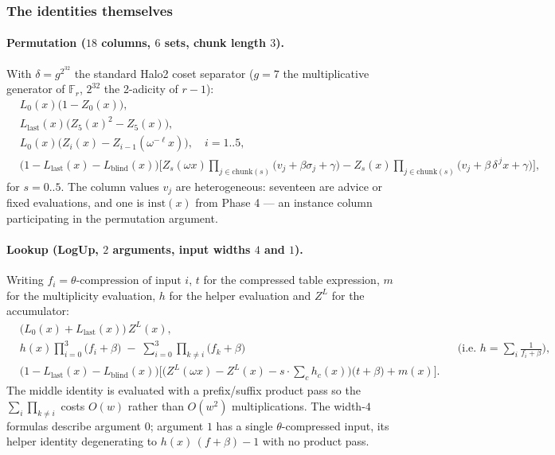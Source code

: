 \documentclass[11pt,a4paper]{article}
\newcommand{\Fr}{\ensuremath{\mathbb{F}_{r}}}
\theoremstyle{definition}
\begin{document}
\subsubsection{The identities themselves}

\paragraph{Permutation ($18$ columns, $6$ sets, chunk length $3$).}
With $\delta = g^{2^{32}}$ the standard Halo2 coset separator
($g=7$ the multiplicative generator of $\Fr$, $2^{32}$ the 2-adicity of
$r-1$):
\begin{align}
&L_0(x)\big(1 - Z_0(x)\big), \\
&L_{\mathrm{last}}(x)\big(Z_5(x)^{2} - Z_5(x)\big), \\
&L_0(x)\big(Z_i(x) - Z_{i-1}(\omega^{-\ell}x)\big), \quad i = 1..5, \\
&\big(1 - L_{\mathrm{last}}(x) - L_{\mathrm{blind}}(x)\big)
 \Big[
   Z_s(\omega x)\!\!\prod_{j \in \mathrm{chunk}(s)}\!\!\big(v_j + \beta\sigma_j + \gamma\big)
   -
   Z_s(x)\!\!\prod_{j \in \mathrm{chunk}(s)}\!\!\big(v_j + \beta\,\delta^{\,j} x + \gamma\big)
 \Big],
\end{align}
for $s = 0..5$. The column values $v_j$ are heterogeneous: seventeen are
advice or fixed evaluations, and one is $\mathrm{inst}(x)$ from Phase 4 --- an
instance column participating in the permutation argument.

\paragraph{Lookup (LogUp, $2$ arguments, input widths $4$ and $1$).}
Writing $f_i = \theta\text{-compression of input }i$, $t$ for the compressed
table expression, $m$ for the multiplicity evaluation, $h$ for the helper
evaluation and $Z^{L}$ for the accumulator:
\begin{align}
&\big(L_0(x) + L_{\mathrm{last}}(x)\big)\, Z^{L}(x), \\
&h(x)\prod_{i=0}^{3}\big(f_i + \beta\big) \;-\; \sum_{i=0}^{3}\prod_{k \ne i}\big(f_k + \beta\big)
&&\Big(\text{i.e. } h = \sum_i \tfrac{1}{f_i+\beta}\Big), \\
&\big(1 - L_{\mathrm{last}}(x) - L_{\mathrm{blind}}(x)\big)
 \Big[\big(Z^{L}(\omega x) - Z^{L}(x) - s\!\cdot\!\textstyle\sum_c h_c(x)\big)\big(t + \beta\big) + m(x)\Big].
\end{align}
The middle identity is evaluated with a prefix/suffix product pass so the
$\sum_i \prod_{k\ne i}$ costs $O(w)$ rather than $O(w^{2})$ multiplications.
The width-$4$ formulas describe argument $0$; argument $1$ has a single
$\theta$-compressed input, its helper identity degenerating to
$h(x)\,(f+\beta) - 1$ with no product pass.
\end{document}

